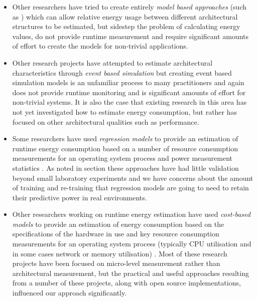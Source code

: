 \begin{itemize}
\item Other researchers have tried to create entirely \emph{model based approaches} (such as \cite{seo2008-energystyle}) which can allow relative energy usage between different architectural structures to be estimated, but sidestep the problem of calculating energy values, do not provide runtime measurement and require significant amounts of effort to create the models for non-trivial applications.

\item Other research projects have attempted to estimate architectural characteristics through \emph{event based simulation} \cite{grahn1998-energystyles} but creating event based simulation models is an unfamiliar process to many practitioners and again does not provide runtime monitoring and is significant amounts of effort for non-trivial systems.  It is also the case that existing research in this area has not yet investigated how to estimate energy consumption, but rather has focused on other architectural qualities such as performance.

\item Some researchers have used \emph{regression models} to provide an estimation of runtime energy consumption based on a number of resource consumption measurements for an operating system process and power measurement statistics \cite{phung2017-agnosticpower}.  As noted in section  these approaches have had little validation beyond small laboratory experiments and we have concerns about the amount of training and re-training that regression models are going to need to retain their predictive power in real environments.

\item Other researchers working on runtime energy estimation have used \emph{cost-based models} to provide an estimation of energy consumption based on the specifications of the hardware in use and key resource consumption measurements for an operating system process (typically CPU utilisation and in some cases network or memory utilisation) \cite{noureddine2015-hotspots, acar2016-beyondcpu}.  Most of these research projects have been focused on micro-level measurement rather than architectural measurement, but the practical and useful approaches resulting from a number of these projects, along with open source implementations, influenced our approach significantly.
\end{itemize}

